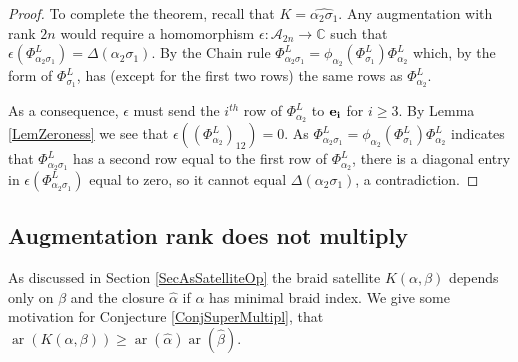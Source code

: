 \documentclass[11pt]{amsart}
\def\s{{\sigma}}
\def\ar{\operatorname{ar}}
\theoremstyle{definition}
\begin{document}
\begin{proof}
To complete the theorem, recall that $K=\hat{\alpha_2\s_1}$. Any augmentation with rank $2n$ would require a homomorphism $\epsilon: \mathcal A_{2n}\to\mathbb C$ such that $\epsilon\left(\Phi_{\alpha_2\s_1}^L\right) = \Delta(\alpha_2\s_1)$. By the Chain rule $\Phi_{\alpha_2\s_1}^L = \phi_{\alpha_2}(\Phi_{\s_1}^L)\Phi_{\alpha_2}^L$ which, by the form of $\Phi_{\s_1}^L$, has (except for the first two rows) the same rows as $\Phi_{\alpha_2}^L$.

As a consequence, $\epsilon$ must send the $i^{th}$ row of $\Phi_{\alpha_2}^L$ to ${\bf e_i}$ for $i\ge 3$. By Lemma \ref{LemZeroness} we see that $\epsilon\left((\Phi_{\alpha_2}^L)_{12}\right) = 0$. As $\Phi_{\alpha_2\s_1}^L = \phi_{\alpha_2}(\Phi_{\s_1}^L)\Phi_{\alpha_2}^L$ indicates that $\Phi_{\alpha_2\s_1}^L$ has a second row equal to the first row of $\Phi_{\alpha_2}^L$, there is a diagonal entry in $\epsilon\left(\Phi_{\alpha_2\s_1}^L\right)$ equal to zero, so it cannot equal $\Delta(\alpha_2\s_1)$, a contradiction.
\end{proof}

\subsection{Augmentation rank does not multiply}
\label{SecMultiplic}

As discussed in Section \ref{SecAsSatelliteOp} the braid satellite $K(\alpha,\beta)$ depends only on $\beta$ and the closure $\hat{\alpha}$ if $\alpha$ has minimal braid index. We give some motivation for Conjecture \ref{ConjSuperMultipl}, that $\ar(K(\alpha,\beta))\ge \ar(\hat{\alpha})\ar(\hat{\beta})$.
\end{document}
